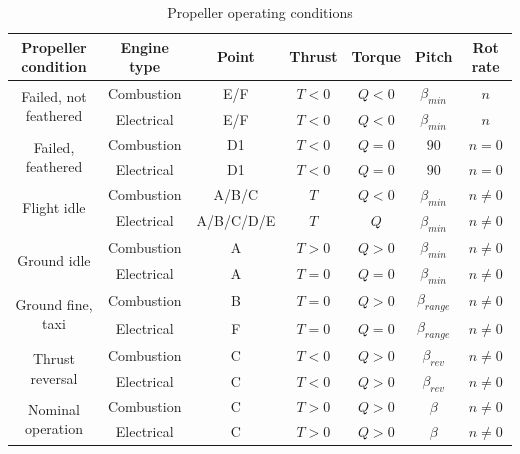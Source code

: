 \begin{table}[!ht]
    \caption{Propeller operating conditions}\label{tab:propeller_oper_conditions}
    \begin{tabular}{cc|ccccc}\\\hline \hline
        Propeller condition                         & Engine type       & Point     & Thrust    & Torque    & Pitch             & Rot rate \\ \hline
        \multirow{2}{*}{Failed, not feathered}      & Combustion        & E/F       & $T<0$     & $Q<0$     & $\beta_{min}$     & $n$ \\
                                                    & Electrical        & E/F       & $T<0$     & $Q<0$     & $\beta_{min}$     & $n$ \\
        \multirow{2}{*}{Failed, feathered}          & Combustion        & D1        & $T<0$     & $Q=0$     & $90$              & $n=0$ \\
                                                    & Electrical        & D1        & $T<0$     & $Q=0$     & $90$              & $n=0$ \\
        \multirow{2}{*}{Flight idle}                & Combustion        & A/B/C     & $T$       & $Q<0$     & $\beta_{min}$     & $n \neq 0$ \\
                                                    & Electrical        & A/B/C/D/E & $T$       & $Q$       & $\beta_{min}$     & $n \neq 0$ \\
        \multirow{2}{*}{Ground idle}                & Combustion        & A         & $T>0$     & $Q>0$     & $\beta_{min}$     & $n \neq 0$ \\
                                                    & Electrical        & A         & $T=0$     & $Q=0$     & $\beta_{min}$     & $n \neq 0$ \\
        \multirow{2}{*}{Ground fine, taxi}          & Combustion        & B         & $T=0$     & $Q>0$     & $\beta_{range}$   & $n \neq 0$ \\
                                                    & Electrical        & F         & $T=0$     & $Q=0$     & $\beta_{range}$   & $n \neq 0$ \\
        \multirow{2}{*}{Thrust reversal}            & Combustion        & C         & $T<0$     & $Q>0$     & $\beta_{rev}$     & $n \neq 0$ \\
                                                    & Electrical        & C         & $T<0$     & $Q>0$     & $\beta_{rev}$     & $n \neq 0$ \\
        \multirow{2}{*}{Nominal operation}          & Combustion        & C         & $T>0$     & $Q>0$     & $\beta$           & $n \neq 0$ \\
                                                    & Electrical        & C         & $T>0$     & $Q>0$     & $\beta$           & $n \neq 0$ \\
    \end{tabular}
\end{table}

